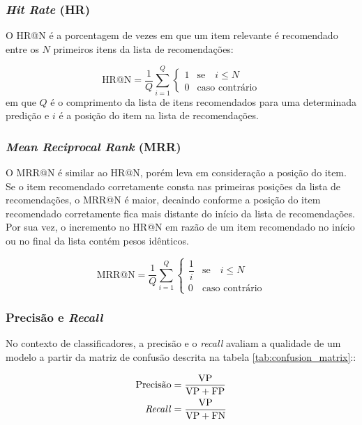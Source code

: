   \subsubsection{\textit{Hit Rate} (HR)}
  O HR@N é a porcentagem de vezes em que um item relevante
  é recomendado entre os $N$ primeiros itens da lista de recomendações:

  \begin{equation}
    \text{HR@N} = \frac{1}{Q}\sum_{i=1}^{Q}\begin{cases}
      1 & \text{se} \quad i \leq N \\
      0 & \text{caso contrário}
    \end{cases}
  \end{equation}
  em que $Q$ é o comprimento da lista de itens recomendados para uma determinada
  predição e $i$ é a posição do item na lista de recomendações.
  \subsubsection{\textit{Mean Reciprocal Rank} (MRR)} O MRR@N é similar ao HR@N,
  porém leva em consideração a posição do item. Se o item recomendado
  corretamente consta nas primeiras posições da lista de recomendações, o MRR@N
  é maior, decaindo conforme a posição do item recomendado corretamente fica
  mais distante do início da lista de recomendações. Por sua vez, o incremento
  no HR@N em razão de um item recomendado no início ou no final da lista contém
  pesos idênticos.

  \begin{equation}
    \text{MRR@N} = \frac{1}{Q}\sum_{i=1}^{Q}\begin{cases}
      \dfrac{1}{i} & \text{se} \quad i \leq N \\
      0 & \text{caso contrário}
    \end{cases}
  \end{equation}

  \subsubsection{Precisão e \textit{Recall}}
  No contexto de classificadores, a precisão e o \textit{recall} avaliam
  a qualidade de um modelo a partir da matriz de confusão descrita
  na tabela \ref{tab:confusion_matrix}::

  \begin{align}
    \text{Precisão} &= \frac{\text{VP}}{\text{VP} + \text{FP}} \\
    \text{\textit{Recall}} &= \frac{\text{VP}}{\text{VP} + \text{FN}}
  \end{align}

